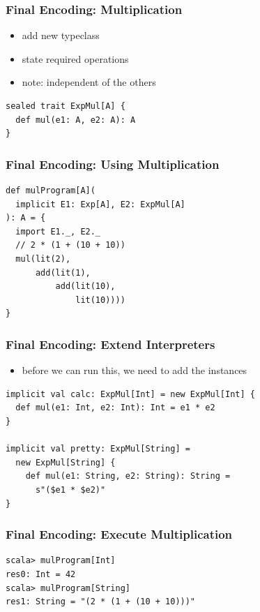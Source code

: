 \documentclass{beamer}
\begin{document}
\begin{frame}[fragile]
  \frametitle{Final Encoding: Multiplication}
  \begin{itemize}
  \item add new typeclass
  \item state required operations
  \item note: independent of the others
  \end{itemize}

\begin{verbatim}
sealed trait ExpMul[A] {
  def mul(e1: A, e2: A): A
}
\end{verbatim}
\end{frame}

\begin{frame}[fragile]
  \frametitle{Final Encoding: Using Multiplication}
\begin{verbatim}
def mulProgram[A](
  implicit E1: Exp[A], E2: ExpMul[A]
): A = {
  import E1._, E2._
  // 2 * (1 + (10 + 10))
  mul(lit(2),
      add(lit(1),
          add(lit(10),
              lit(10))))
}
\end{verbatim}
\end{frame}

\begin{frame}[fragile]
  \frametitle{Final Encoding: Extend Interpreters}
  \begin{itemize}
  \item before we can run this, we need to add the instances
  \end{itemize}
\begin{verbatim}
implicit val calc: ExpMul[Int] = new ExpMul[Int] {
  def mul(e1: Int, e2: Int): Int = e1 * e2
}

implicit val pretty: ExpMul[String] =
  new ExpMul[String] {
    def mul(e1: String, e2: String): String =
      s"($e1 * $e2)"
}

\end{verbatim}
\end{frame}

\begin{frame}[fragile]
  \frametitle{Final Encoding: Execute Multiplication}
\begin{verbatim}
scala> mulProgram[Int]
res0: Int = 42
scala> mulProgram[String]
res1: String = "(2 * (1 + (10 + 10)))"
\end{verbatim}
\end{frame}
\end{document}
